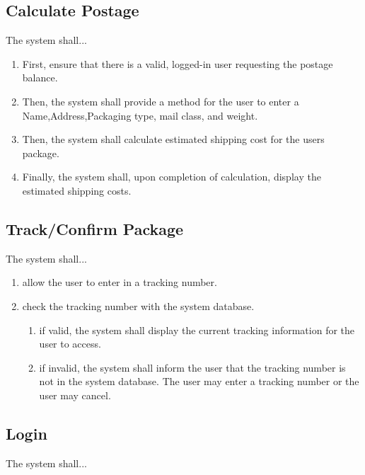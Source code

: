 \documentclass{scrreprt}
\begin{document}
\subsection{Calculate Postage}

The system shall...

\begin{enumerate}
\item First, ensure that there is a valid, logged-in user requesting the
postage balance.  
\item Then, the system shall provide a method for the user to enter a
Name,Address,Packaging type, mail class, and weight.
\item Then, the system shall calculate estimated shipping cost for the users
package.
\item Finally, the system shall, upon completion of calculation, display the
estimated shipping costs.  
\end{enumerate}

\subsection{Track/Confirm Package}

The system shall...

\begin{enumerate}
\item allow the user to enter in a tracking number.
\item check the tracking number with the system database.
\begin{enumerate}
\item if valid, the system shall display the current tracking information for
the user to access.
\item if invalid, the system shall inform the user that the tracking number is
not in the system database. The user may enter a tracking number or the user
may cancel. 
\end{enumerate}
\end{enumerate}

\subsection{Login}

The system shall...
\end{document}
